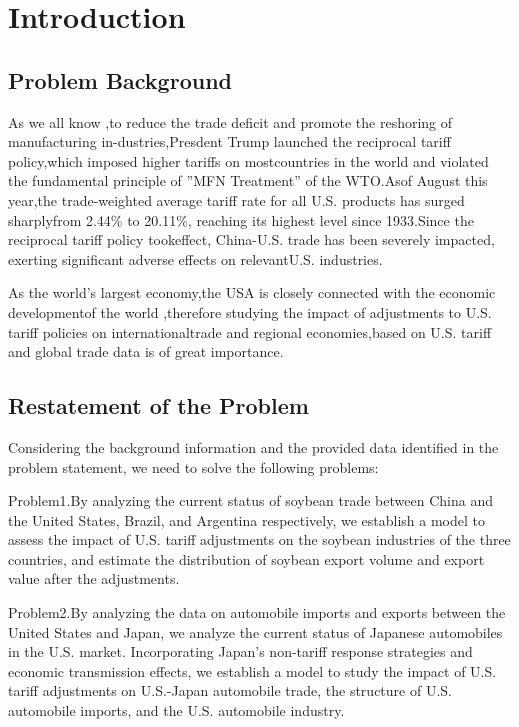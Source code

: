 \documentclass{apmcmthesis}
\begin{document}
\newpage
\tableofcontents


\newpage
\pagestyle{mainmatterstyle}
\setcounter{page}{1}
\section{Introduction}

\subsection{Problem Background}
As we all know ,to reduce the trade deficit and promote the reshoring of manufacturing in-dustries,Presdent Trump launched the reciprocal tariff policy,which imposed higher tariffs on mostcountries in the world and violated the fundamental principle of ”MFN Treatment” of the WTO.Asof August this year,the trade-weighted average tariff rate for all U.S. products has surged sharplyfrom 2.44\% to 20.11\%, reaching its highest level since 1933.Since the reciprocal tariff policy tookeffect, China-U.S. trade has been severely impacted, exerting significant adverse effects on relevantU.S. industries.

As the world's largest economy,the USA is closely connected with the economic developmentof the world ,therefore studying the impact of adjustments to U.S. tariff policies on internationaltrade and regional economies,based on U.S. tariff and global trade data is of great importance.

\subsection{Restatement of the Problem}
Considering the background information and the provided data identiﬁed in the problem statement, we need
to solve the following problems:

Problem1.By analyzing the current status of soybean trade between China and the United States, Brazil, and Argentina respectively, we establish a model to assess the impact of U.S. tariff adjustments on the soybean industries of the three countries, and estimate the distribution of soybean export volume and export value after the adjustments.

Problem2.By analyzing the data on automobile imports and exports between the United States and Japan, we analyze the current status of Japanese automobiles in the U.S. market. Incorporating Japan’s non-tariff response strategies and economic transmission effects, we establish a model to study the impact of U.S. tariff adjustments on U.S.-Japan automobile trade, the structure of U.S. automobile imports, and the U.S. automobile industry.
\end{document}
